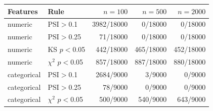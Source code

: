 \begin{tabular}{llrrr}
\toprule
Features & Rule & $n=100$ & $n=500$ & $n=2000$ \\
\midrule
numeric & PSI$>$0.1 & 3982/18000 & 0/18000 & 0/18000 \\
numeric & PSI$>$0.25 & 71/18000 & 0/18000 & 0/18000 \\
numeric & KS $p$$<$0.05 & 442/18000 & 465/18000 & 452/18000 \\
numeric & $\chi^2$ $p$$<$0.05 & 857/18000 & 887/18000 & 880/18000 \\
categorical & PSI$>$0.1 & 2684/9000 & 3/9000 & 0/9000 \\
categorical & PSI$>$0.25 & 78/9000 & 0/9000 & 0/9000 \\
categorical & $\chi^2$ $p$$<$0.05 & 500/9000 & 540/9000 & 643/9000 \\
\bottomrule
\end{tabular}